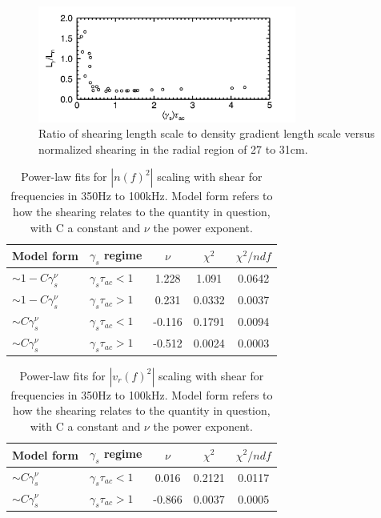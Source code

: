 \documentclass[aip,pop,amsmath,amssymb,reprint,superscriptaddress]{revtex4-1} %
\begin{document}
\begin{figure}[!htbp]
\centerline{
\includegraphics[width=8.5cm]{LgammaLn}}
\caption{\label{fig:LgammaLn} Ratio of shearing length scale to density gradient length scale versus normalized shearing in the radial region of 27 to 31cm.}
\end{figure}

\begin{table}
\caption{\label{tab:table1}Power-law fits for $|n(\textit{f})^{2}|$ scaling with shear for frequencies in 350Hz to 100kHz. Model form refers to how the shearing relates to the quantity in question, with C a constant and $\nu$ the power exponent.}
\begin{ruledtabular}
\begin{tabular}{llccc}
Model form&$\gamma_{s}$ regime&$\nu$&$\chi^2$&$\chi^2/ndf$\\
\hline
$\sim 1-C\gamma_{s}^\nu$&$\gamma_{s}\tau_{ac}<1$&1.228&1.091&0.0642\\
$\sim 1-C\gamma_{s}^\nu$&$\gamma_{s}\tau_{ac}>1$&0.231&0.0332&0.0037\\
$\sim C\gamma_{s}^\nu$&$\gamma_{s}\tau_{ac}<1$&-0.116&0.1791&0.0094\\
$\sim C\gamma_{s}^\nu$&$\gamma_{s}\tau_{ac}>1$&-0.512&0.0024&0.0003\\
\end{tabular}
\end{ruledtabular}
\end{table}

\begin{table}
\caption{\label{tab:table2}Power-law fits for $|v_{r}(\textit{f})^{2}|$ scaling with shear for frequencies in 350Hz to 100kHz. Model form refers to how the shearing relates to the quantity in question, with C a constant and $\nu$ the power exponent.}
\begin{ruledtabular}
\begin{tabular}{llccc}
Model form&$\gamma_{s}$ regime&$\nu$&$\chi^2$&$\chi^2/ndf$\\
\hline
$\sim C\gamma_{s}^\nu$&$\gamma_{s}\tau_{ac}<1$&0.016&0.2121&0.0117\\
$\sim C\gamma_{s}^\nu$&$\gamma_{s}\tau_{ac}>1$&-0.866&0.0037&0.0005\\
\end{tabular}
\end{ruledtabular}
\end{table}
\end{document}
